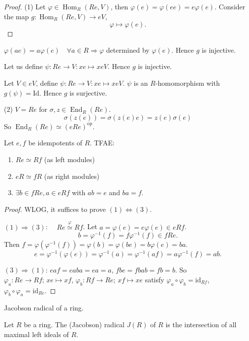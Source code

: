 \documentclass[11pt, a4paper]{report}
\begin{document}
\begin{proof}
(1) Let $\varphi \in \operatorname{Hom}_{R}(Re, V)$, then $\varphi(e)=\varphi(ee)=e\varphi(e)$. Consider the map $g: \operatorname{Hom}_{R}(Re, V) \rightarrow eV$,
\[
\varphi \mapsto \varphi(e).
\]
\end{proof}
$\varphi(ae)=a\varphi(e) \quad \forall a \in R \Rightarrow \varphi$ determined by $\varphi(e)$. Hence $g$ is injective.

Let us define $\psi\colon Re \to V\colon xe \mapsto xeV$. Hence $g$ is injective.

Let $V \in eV$, define $\psi\colon Re \to V\colon xe \mapsto xeV$. $\psi$ is an $R$-homomorphism with $g(\psi)=\mathrm{Id}$. Hence $g$ is surjective.

(2) $V=Re$ for $\sigma, z \in \operatorname{End}_{R}(Re)$.
\[
\sigma(z(e))=\sigma(z(e)e)=z(e)\sigma(e)
\]
So $\operatorname{End}_{R}(Re) \simeq (eRe)^{\mathrm{op}}$.

\begin{theorem}
Let $e, f$ be idempotents of $R$. TFAE:
\begin{enumerate}
\item $Re \simeq Rf$ (as left modules)
\item $eR \simeq fR$ (as right modules)
\item $\exists b \in fRe, a \in eRf$ with $ab=e$ and $ba=f$.
\end{enumerate}
\end{theorem}

\begin{proof}
WLOG, it suffices to prove $(1) \Leftrightarrow (3)$.

$(1)\Rightarrow(3)$: $\quad Re \stackrel{\varphi}{\simeq} Rf$.
Let $a=\varphi(e)=e\varphi(e) \in eRf$.
\[
b=\varphi^{-1}(f)=f\varphi^{-1}(f) \in fRe.
\]
Then $f=\varphi(\varphi^{-1}(f))=\varphi(b)=\varphi(be)=b\varphi(e)=ba$.
\[
e=\varphi^{-1}(\varphi(e))=\varphi^{-1}(a)=\varphi^{-1}(af)=a\varphi^{-1}(f)=ab.
\]

$(3)\Rightarrow(1)$: $eaf=eaba=ea=a$, $fbe=fbab=fb=b$.
So $\varphi_{a}\colon Re \to Rf;\, xe \mapsto xf$,
$\varphi_{b}\colon Rf \to Re;\, xf \mapsto xe$
satisfy $\varphi_{a} \circ \varphi_{b} = \mathrm{id}_{Rf}$, $\varphi_{b} \circ \varphi_{a} = \mathrm{id}_{Re}$.
\end{proof}

\begin{definition}
Jacobson radical of a ring.

Let $R$ be a ring. The (Jacobson) radical $J(R)$ of $R$ is the intersection of all maximal left ideals of $R$.
\end{definition}
\end{document}
